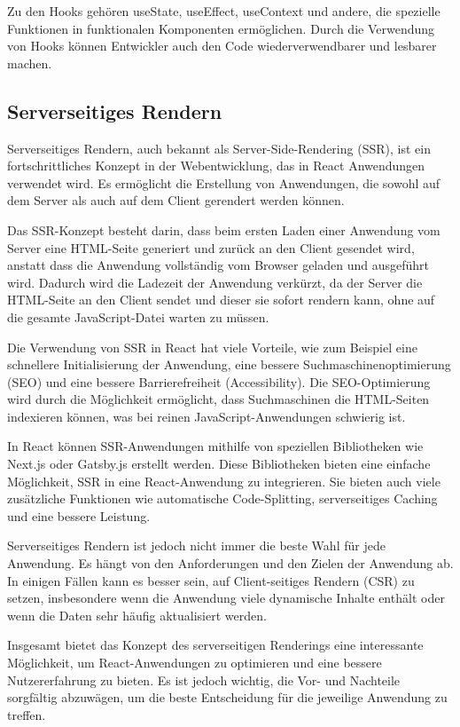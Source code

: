Zu den Hooks gehören useState, useEffect, useContext und andere, die spezielle Funktionen in funktionalen Komponenten ermöglichen. Durch die Verwendung von Hooks können Entwickler auch den Code wiederverwendbarer und lesbarer machen.

\subsection{Serverseitiges Rendern}
Serverseitiges Rendern, auch bekannt als Server-Side-Rendering (SSR), ist ein fortschrittliches Konzept in der Webentwicklung, das in React Anwendungen verwendet wird. Es ermöglicht die Erstellung von Anwendungen, die sowohl auf dem Server als auch auf dem Client gerendert werden können.

Das SSR-Konzept besteht darin, dass beim ersten Laden einer Anwendung vom Server eine HTML-Seite generiert und zurück an den Client gesendet wird, anstatt dass die Anwendung vollständig vom Browser geladen und ausgeführt wird. Dadurch wird die Ladezeit der Anwendung verkürzt, da der Server die HTML-Seite an den Client sendet und dieser sie sofort rendern kann, ohne auf die gesamte JavaScript-Datei warten zu müssen.

Die Verwendung von SSR in React hat viele Vorteile, wie zum Beispiel eine schnellere Initialisierung der Anwendung, eine bessere Suchmaschinenoptimierung (SEO) und eine bessere Barrierefreiheit (Accessibility). Die SEO-Optimierung wird durch die Möglichkeit ermöglicht, dass Suchmaschinen die HTML-Seiten indexieren können, was bei reinen JavaScript-Anwendungen schwierig ist.

In React können SSR-Anwendungen mithilfe von speziellen Bibliotheken wie Next.js oder Gatsby.js erstellt werden. Diese Bibliotheken bieten eine einfache Möglichkeit, SSR in eine React-Anwendung zu integrieren. Sie bieten auch viele zusätzliche Funktionen wie automatische Code-Splitting, serverseitiges Caching und eine bessere Leistung.

Serverseitiges Rendern ist jedoch nicht immer die beste Wahl für jede Anwendung. Es hängt von den Anforderungen und den Zielen der Anwendung ab. In einigen Fällen kann es besser sein, auf Client-seitiges Rendern (CSR) zu setzen, insbesondere wenn die Anwendung viele dynamische Inhalte enthält oder wenn die Daten sehr häufig aktualisiert werden.

Insgesamt bietet das Konzept des serverseitigen Renderings eine interessante Möglichkeit, um React-Anwendungen zu optimieren und eine bessere Nutzererfahrung zu bieten. Es ist jedoch wichtig, die Vor- und Nachteile sorgfältig abzuwägen, um die beste Entscheidung für die jeweilige Anwendung zu treffen.


